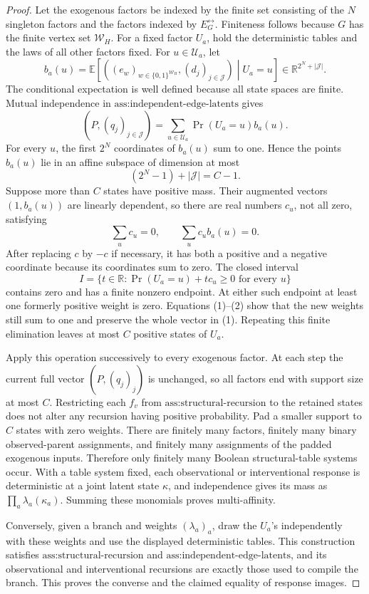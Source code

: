 \documentclass{article}
\begin{document}
\begin{proof}
Let the exogenous factors be indexed by the finite set consisting of the \(N\) singleton factors and the factors indexed by \(E_G^{\leftrightarrow}\).  Finiteness follows because \(G\) has the finite vertex set \(\mathcal W_H\).  For a fixed factor \(U_a\), hold the deterministic tables and the laws of all other factors fixed.  For \(u\in\mathcal U_a\), let
\[
b_a(u)=\mathbb E\!\left[\left((e_w)_{w\in\{0,1\}^{\mathcal W_H}},(d_j)_{j\in\mathcal J}\right)\middle|U_a=u\right]
 \in\mathbb R^{2^N+|\mathcal J|}.
\]
The conditional expectation is well defined because all state spaces are finite.  Mutual independence in \(\text{ass:independent-edge-latents}\) gives
\[
\left(P,(q_j)_{j\in\mathcal J}\right)
=\sum_{u\in\mathcal U_a}\Pr(U_a=u)b_a(u).
\tag{1}
\]
For every \(u\), the first \(2^N\) coordinates of \(b_a(u)\) sum to one.  Hence the points \(b_a(u)\) lie in an affine subspace of dimension at most
\[
(2^N-1)+|\mathcal J|=C-1.
\]
Suppose more than \(C\) states have positive mass.  Their augmented vectors \((1,b_a(u))\) are linearly dependent, so there are real numbers \(c_u\), not all zero, satisfying
\[
\sum_u c_u=0,\qquad \sum_u c_u b_a(u)=0.
\tag{2}
\]
After replacing \(c\) by \(-c\) if necessary, it has both a positive and a negative coordinate because its coordinates sum to zero.  The closed interval
\[
I=\{t\in\mathbb R:\Pr(U_a=u)+t c_u\ge0\text{ for every }u\}
\]
contains zero and has a finite nonzero endpoint.  At either such endpoint at least one formerly positive weight is zero.  Equations (1)--(2) show that the new weights still sum to one and preserve the whole vector in (1).  Repeating this finite elimination leaves at most \(C\) positive states of \(U_a\).

Apply this operation successively to every exogenous factor.  At each step the current full vector \((P,(q_j)_j)\) is unchanged, so all factors end with support size at most \(C\).  Restricting each \(f_v\) from \(\text{ass:structural-recursion}\) to the retained states does not alter any recursion having positive probability.  Pad a smaller support to \(C\) states with zero weights.  There are finitely many factors, finitely many binary observed-parent assignments, and finitely many assignments of the padded exogenous inputs.  Therefore only finitely many Boolean structural-table systems occur.  With a table system fixed, each observational or interventional response is deterministic at a joint latent state \(\kappa\), and independence gives its mass as \(\prod_a\lambda_a(\kappa_a)\).  Summing these monomials proves multi-affinity.

Conversely, given a branch and weights \((\lambda_a)_a\), draw the \(U_a\)'s independently with these weights and use the displayed deterministic tables.  This construction satisfies \(\text{ass:structural-recursion}\) and \(\text{ass:independent-edge-latents}\), and its observational and interventional recursions are exactly those used to compile the branch.  This proves the converse and the claimed equality of response images.
\end{proof}
\end{document}
